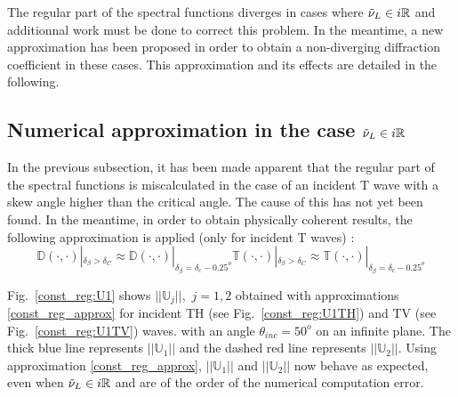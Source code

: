The regular part of the spectral functions diverges in cases where $\tilde{\nu}_L \in i\mathbb{R}$ and additionnal work must be done to correct this problem. In the meantime, a new approximation has been proposed in order to obtain a non-diverging diffraction coefficient in these cases. This approximation and its effects are detailed in the following.

\subsection{Numerical approximation in the case $\tilde{\nu}_L \in i\mathbb{R}$}

In the previous subsection, it has been made apparent that the regular part of the spectral functions is miscalculated in the case of an incident T wave with a skew angle higher than the critical angle. The cause of this has not yet been found. In the meantime, in order to obtain physically coherent results, the following approximation is applied (only for incident T waves) :
\begin{subequations}
\begin{equation}
\mathbb{D}(\cdot,\cdot)|_{\delta_{\beta}>\delta_C} \approx \mathbb{D}(\cdot,\cdot)|_{\delta_{\beta}=\delta_c-0.25^o}
\end{equation}
\begin{equation}
\mathbb{T}(\cdot,\cdot)|_{\delta_{\beta}>\delta_C} \approx \mathbb{T}(\cdot,\cdot)|_{\delta_{\beta}=\delta_c-0.25^o}
\end{equation}
\label{const_reg_approx}
\end{subequations}

Fig.~\ref{const_reg:U1} shows $||\mathbb{U}_j||, \, \, j=1,2$ obtained with approximations \eqref{const_reg_approx} for incident TH (see Fig.~\ref{const_reg:U1TH}) and TV (see Fig.~\ref{const_reg:U1TV}) waves. with an angle $\theta_{inc}=50^o$ on an infinite plane. The thick blue line represents $||\mathbb{U}_1||$ and the dashed red line represents $||\mathbb{U}_2||$. Using  approximation \eqref{const_reg_approx}, $||\mathbb{U}_1||$ and $||\mathbb{U}_2||$ now behave as expected, even when $\tilde{\nu}_L \in i\mathbb{R}$ and are  of the order of the numerical computation error.

